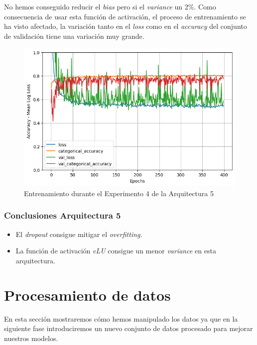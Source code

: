 \documentclass{article}
\begin{document}
		    No hemos conseguido reducir el \textit{bias} pero si el \textit{variance} un 2\%. Como consecuencia de usar esta funci\'on de activaci\'on, el proceso de entrenamiento se ha visto afectado, la variaci\'on tanto en el \textit{loss} como en el \textit{accuracy} del conjunto de validaci\'on tiene una variaci\'on muy grande.
			\begin{figure}[!h]
				\begin{center}
					\includegraphics[scale=0.5]{d-tr-a5-e4.png}		
					\caption{Entrenamiento durante el Experimento 4 de la Arquitectura 5}	
					\label{d-tr-a5-e4}
				\end{center}
			\end{figure}
		
		
		\subsubsection{Conclusiones Arquitectura 5}
		\label{d-cl-a5}
			\begin{itemize}
				\item El \textit{dropout} consigue mitigar el \textit{overfitting}.
				\item La funci\'on de activaci\'on \textit{eLU} consigue un menor \textit{variance} en esta arquitectura.
			\end{itemize}
			
	\section{Procesamiento de datos}
	\label{d-s-dp}
		En esta secci\'on mostraremos c\'omo hemos manipulado los datos ya que en la siguiente fase introduciremos un nuevo conjunto de datos procesado para mejorar nuestros modelos.
		
\end{document}
